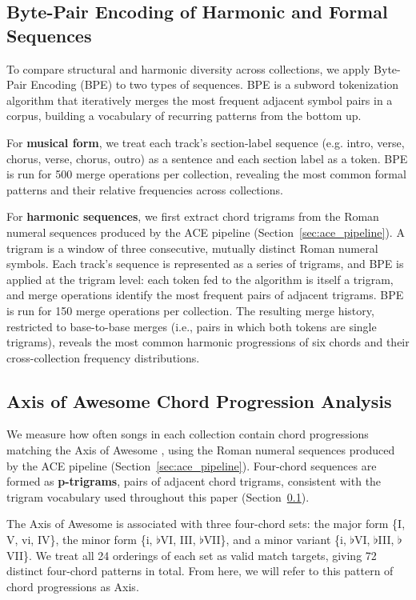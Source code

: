 \documentclass{article}
\begin{document}
\subsection{Byte-Pair Encoding of Harmonic and Formal Sequences}
\label{sec:bpe}

To compare structural and harmonic diversity across collections, we apply Byte-Pair Encoding (BPE) \citep{sennrich2016neural} to two types of sequences. BPE is a subword tokenization algorithm that iteratively merges the most frequent adjacent symbol pairs in a corpus, building a vocabulary of recurring patterns from the bottom up.

For \textbf{musical form}, we treat each track's section-label sequence (e.g. intro, verse, chorus, verse, chorus, outro) as a sentence and each section label as a token. BPE is run for 500 merge operations per collection, revealing the most common formal patterns and their relative frequencies across collections.

For \textbf{harmonic sequences}, we first extract chord trigrams from the Roman numeral sequences produced by the ACE pipeline (Section~\ref{sec:ace_pipeline}). A trigram is a window of three consecutive, mutually distinct Roman numeral symbols. Each track's sequence is represented as a series of trigrams, and BPE is applied at the trigram level: each token fed to the algorithm is itself a trigram, and merge operations identify the most frequent pairs of adjacent trigrams. BPE is run for 150 merge operations per collection. The resulting merge history, restricted to base-to-base merges (i.e., pairs in which both tokens are single trigrams), reveals the most common harmonic progressions of six chords and their cross-collection frequency distributions.

\subsection{Axis of Awesome Chord Progression Analysis}
\label{sec:axis}

We measure how often songs in each collection contain chord progressions matching the Axis of Awesome \citep{richards2017tonal}, using the Roman numeral sequences produced by the ACE pipeline (Section~\ref{sec:ace_pipeline}). Four-chord sequences are formed as \textbf{p-trigrams}, pairs of adjacent chord trigrams, consistent with the trigram vocabulary used throughout this paper (Section~\ref{sec:bpe}).

The Axis of Awesome is associated with three four-chord sets: the major form \{I, V, vi, IV\}, the minor form \{i, $\flat$VI, III, $\flat$VII\}, and a minor variant \{i, $\flat$VI, $\flat$III, $\flat$VII\}. We treat all 24 orderings of each set as valid match targets, giving 72 distinct four-chord patterns in total. From here, we will refer to this pattern of chord progressions as Axis.
\end{document}
